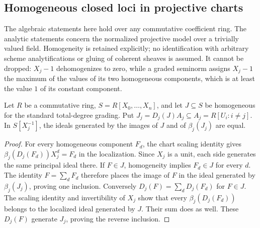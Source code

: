 \subsection{Homogeneous closed loci in projective charts}
\label{subsec:closed-projective-charts}

The algebraic statements here hold over any commutative coefficient ring.
The analytic statements concern the normalized projective model over a trivially
valued field. Homogeneity is retained explicitly; no identification with arbitrary
scheme analytifications or gluing of coherent sheaves is assumed.
It cannot be dropped: $X_j-1$ dehomogenizes to zero, while a graded seminorm
assigns $X_j-1$ the maximum of the values of its two homogeneous components,
which is at least the value $1$ of its constant component.

\begin{lemma}
\label{closed-charts:localized-ideal}
\leanok
{}
Let $R$ be a commutative ring, $S=R[X_0,\ldots,X_n]$, and let $J\subseteq S$
be homogeneous for the standard total-degree grading. Put
$J_j=D_j(J)A_j\subseteq A_j=R[U_i:i\ne j]$.
In $S[X_j^{-1}]$, the ideals generated by the images of $J$ and of
$\beta_j(J_j)$ are equal.
\end{lemma}
\begin{proof}
For every homogeneous component $F_d$, the chart scaling identity gives
$\beta_j(D_j(F_d))X_j^d=F_d$ in the localization. Since $X_j$ is a unit,
each side generates the same principal ideal there.
If $F\in J$, homogeneity implies $F_d\in J$ for every $d$.
The identity $F=\sum_dF_d$ therefore places the image of $F$ in the ideal
generated by $\beta_j(J_j)$, proving one inclusion.
Conversely $D_j(F)=\sum_dD_j(F_d)$ for $F\in J$.
The scaling identity and invertibility of $X_j$ show that every
$\beta_j(D_j(F_d))$ belongs to the localized ideal generated by $J$.
Their sum does as well. These $D_j(F)$ generate $J_j$, proving the reverse inclusion.
\end{proof}

